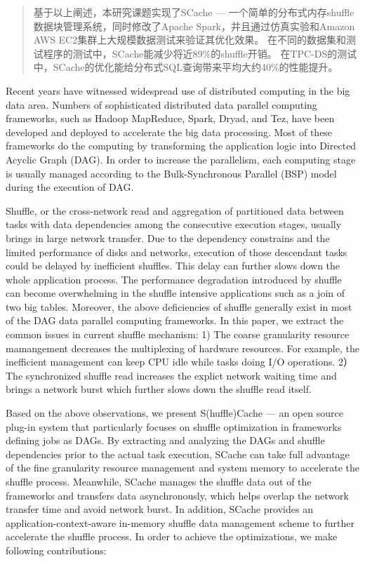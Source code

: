 \begin{abstract}
基于以上阐述，本研究课题实现了SCache --- 一个简单的分布式内存shuffle数据块管理系统，同时修改了Apache Spark，并且通过仿真实验和Amazon AWS EC2集群上大规模数据测试来验证其优化效果。
在不同的数据集和测试程序的测试中，SCache能减少将近89\%的shuffle开销。
在TPC-DS的测试中，SCache的优化能给分布式SQL查询带来平均大约40\%的性能提升。

\end{abstract}

\begin{englishabstract}

Recent years have witnessed widespread use of distributed computing in the big data area.
Numbers of sophisticated distributed data parallel computing frameworks, such as Hadoop MapReduce\cite{hadoop}, Spark\cite{spark}, Dryad\cite{dryad}, and Tez\cite{tez},
have been developed and deployed to accelerate the big data processing.
Most of these frameworks do the computing by transforming the application logic into Directed Acyclic Graph (DAG).
In order to increase the parallelism, each computing stage is usually managed according to the Bulk-Synchronous Parallel (BSP) model during the execution of DAG.

Shuffle, or the cross-network read and aggregation of partitioned data between tasks with data dependencies among the consecutive execution stages, 
usually brings in large network transfer. 
Due to the dependency constrains and the limited performance of disks and networks, execution of those descendant tasks could be delayed by inefficient shuffles. 
This delay can further slows down the whole application process. 
The performance degradation introduced by shuffle can become overwhelming in the shuffle intensive applications such as a join of two big tables.
Moreover, the above deficiencies of shuffle generally exist in most of the DAG data parallel computing frameworks. 
In this paper, we extract the common issues in current shuffle mechanism: 
1) The coarse granularity resource mamangement decreases the multiplexing of hardware resources. For example, the inefficient management can keep CPU idle while tasks doing I/O operations.
2）The synchronized shuffle read increases the explict network waiting time and brings a network burst which further slows down the shuffle read itself.

Based on the above observations, we present S(huffle)Cache --- an open source plug-in system that particularly focuses on shuffle optimization in frameworks defining jobs as DAGs. 
By extracting and analyzing the DAGs and shuffle dependencies prior to the actual task execution, 
SCache can take full advantage of the fine granularity resource management and system memory to accelerate the shuffle process. 
Meanwhile, SCache manages the shuffle data out of the frameworks and transfers data asynchronously, which helps overlap the network transfer time and avoid network burst.
In addition, SCache provides an application-context-aware in-memory shuffle data management scheme to further accelerate the shuffle process.  
In order to achieve the optimizations, we make following contributions:


\end{englishabstract}
